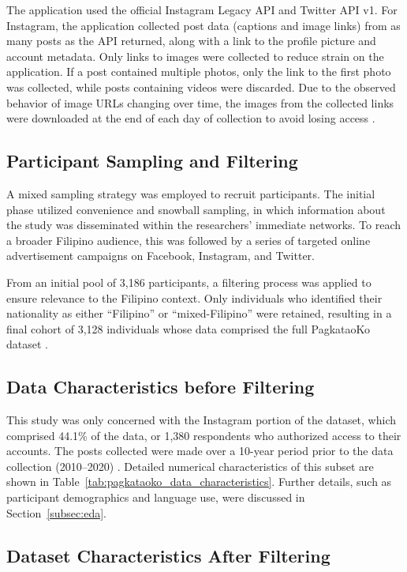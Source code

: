 The application used the official Instagram Legacy API and Twitter API v1. For Instagram, the application collected post data (captions and image links) from as many posts as the API returned, along with a link to the profile picture and account metadata. Only links to images were collected to reduce strain on the application. If a post contained multiple photos, only the link to the first photo was collected, while posts containing videos were discarded. Due to the observed behavior of image URLs changing over time, the images from the collected links were downloaded at the end of each day of collection to avoid losing access \citep{tighe_acorda_2022}.

\subsection{Participant Sampling and Filtering}
A mixed sampling strategy was employed to recruit participants. The initial phase utilized convenience and snowball sampling, in which information about the study was disseminated within the researchers’ immediate networks. To reach a broader Filipino audience, this was followed by a series of targeted online advertisement campaigns on Facebook, Instagram, and Twitter.

From an initial pool of 3,186 participants, a filtering process was applied to ensure relevance to the Filipino context. Only individuals who identified their nationality as either “Filipino” or “mixed-Filipino” were retained, resulting in a final cohort of 3,128 individuals whose data comprised the full PagkataoKo dataset \citep{tighe_acorda_2022}.


\subsection{Data Characteristics before Filtering}
This study was only concerned with the Instagram portion of the dataset, which comprised 44.1\% of the data, or 1,380 respondents who authorized access to their accounts. The posts collected were made over a 10-year period prior to the data collection (2010–2020) \citep{tighe_acorda_2022}. Detailed numerical characteristics of this subset are shown in Table~\ref{tab:pagkataoko_data_characteristics}. Further details, such as participant demographics and language use, were discussed in Section~\ref{subsec:eda}.

\subsection{Dataset Characteristics After Filtering}
\label{subsec:final_data_characteristics}

